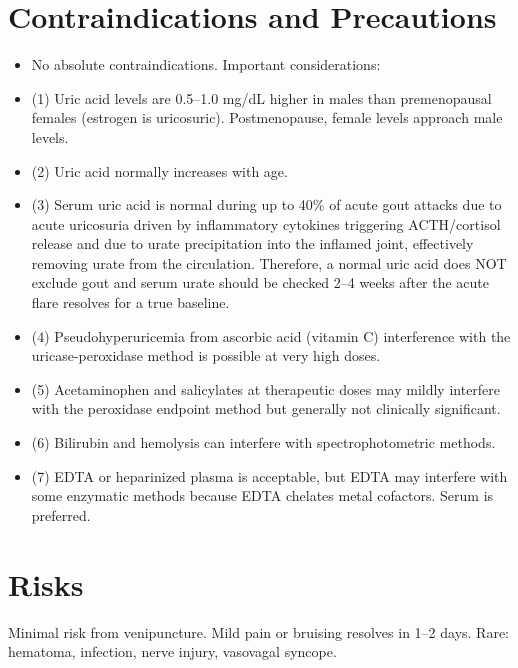 \section*{Contraindications and Precautions}
\begin{itemize}
  \item No absolute contraindications. Important considerations:
  \item (1) Uric acid levels are 0.5--1.0 mg/dL higher in males than premenopausal females (estrogen is uricosuric). Postmenopause, female levels approach male levels.
  \item (2) Uric acid normally increases with age.
  \item (3) Serum uric acid is normal during up to 40\% of acute gout attacks due to acute uricosuria driven by inflammatory cytokines triggering ACTH/cortisol release and due to urate precipitation into the inflamed joint, effectively removing urate from the circulation. Therefore, a normal uric acid does NOT exclude gout and serum urate should be checked 2--4 weeks after the acute flare resolves for a true baseline.
  \item (4) Pseudohyperuricemia from ascorbic acid (vitamin C) interference with the uricase-peroxidase method is possible at very high doses.
  \item (5) Acetaminophen and salicylates at therapeutic doses may mildly interfere with the peroxidase endpoint method but generally not clinically significant.
  \item (6) Bilirubin and hemolysis can interfere with spectrophotometric methods.
  \item (7) EDTA or heparinized plasma is acceptable, but EDTA may interfere with some enzymatic methods because EDTA chelates metal cofactors. Serum is preferred.
\end{itemize}
\section*{Risks}
Minimal risk from venipuncture. Mild pain or bruising resolves in 1--2 days. Rare: hematoma, infection, nerve injury, vasovagal syncope.

